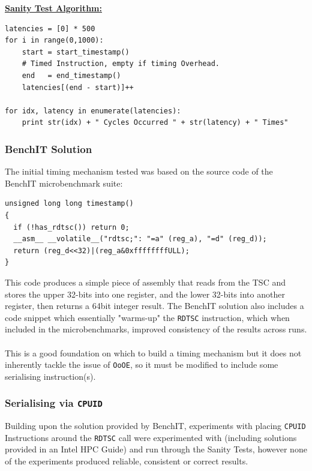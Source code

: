 \documentclass[bsc,frontabs,twoside,singlespacing,parskip,deptreport]{infthesis}     %
\begin{document}
\underline{\textbf{Sanity Test Algorithm:}}\label{sanity-test-algo} \\
\begin{verbatim}
latencies = [0] * 500
for i in range(0,1000):
    start = start_timestamp()
    # Timed Instruction, empty if timing Overhead.
    end   = end_timestamp()
    latencies[(end - start)]++

for idx, latency in enumerate(latencies):
    print str(idx) + " Cycles Occurred " + str(latency) + " Times"
\end{verbatim}


\subsubsection{BenchIT Solution\cite{benchit_src}}\label{benchit-disc}
The initial timing mechanism tested was based on the source code of the BenchIT microbenchmark suite:
\begin{verbatim}
unsigned long long timestamp()
{
  if (!has_rdtsc()) return 0;
  __asm__ __volatile__("rdtsc;": "=a" (reg_a), "=d" (reg_d));
  return (reg_d<<32)|(reg_a&0xffffffffULL);
}
\end{verbatim}
This code produces a simple piece of assembly that reads from the TSC and stores the upper 32-bits into one register, and the lower 32-bits into another register, then returns a 64bit integer result. The BenchIT solution also includes a code snippet which essentially "warms-up" the \texttt{RDTSC} instruction, which when included in the microbenchmarks, improved consistency of the results across runs.\\
\\
This is a good foundation on which to build a timing mechanism but it does not inherently tackle the issue of \texttt{OoOE}, so it must be modified to include some serialising instruction(s).

\subsubsection{Serialising via \texttt{CPUID}}
Building upon the solution provided by BenchIT, experiments with placing \texttt{CPUID} Instructions around the \texttt{RDTSC} call were experimented with (including solutions provided in an Intel HPC Guide\cite{intel_hpc_guide}) and run through the Sanity Tests, however none of the experiments produced reliable, consistent or correct results.
\end{document}
